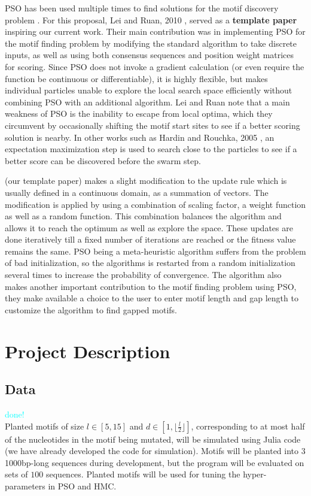 \documentclass{article}
\begin{document}
PSO has been used multiple times to find solutions for the motif discovery problem \cite{hardin2005dna,lei2010particle,reddy2010planted,ge2019discovery}. For this proposal, Lei and Ruan, 2010 \cite{lei2010particle}, served as a \textbf{template paper} inspiring our current work. Their main contribution was in implementing PSO for the motif finding problem by modifying the standard algorithm to take discrete inputs, as well as using both consensus sequences and position weight matrices for scoring. Since PSO does not invoke a gradient calculation (or even require the function be continuous or differentiable), it is highly flexible, but makes individual particles unable to explore the local search space efficiently without combining PSO with an additional algorithm. Lei and Ruan note that a main weakness of PSO is the inability to escape from local optima, which they circumvent by occasionally shifting the motif start sites to see if a better scoring solution is nearby. In other works such as Hardin and Rouchka, 2005 \cite{hardin2005dna}, an expectation maximization step is used to search close to the particles to see if a better score can be discovered before the swarm step.

\cite{lei2010particle}(our template paper) makes a slight modification to the update rule which is usually defined in a continuous domain, as a summation of vectors. The modification is applied by using a combination of scaling factor, a weight function as well as a random function. This combination balances the algorithm and allows it to reach the optimum as well as explore the space. These updates are done iteratively till a fixed number of iterations are reached or the fitness value remains the same. PSO being a meta-heuristic algorithm suffers from the problem of bad initialization, so the algorithms is restarted from a random initialization several times to increase the probability of convergence.
The algorithm also makes another important contribution to the motif finding problem using PSO, they make available a choice to the user to enter motif length and gap length to customize the algorithm to find gapped motifs. 
\section{Project Description}
\subsection{Data}
\textcolor{cyan}{done!} \\
Planted motifs of size $l \in [5, 15]$ and $d \in [1, \lfloor \frac{l}{2} \rfloor]$, corresponding to at most half of the nucleotides in the motif being mutated, will be simulated using Julia code (we have already developed the code for simulation). Motifs will be planted into $3$ 1000bp-long sequences during development, but the program will be evaluated on sets of $100$ sequences. Planted motifs will be used for tuning the hyper-parameters in PSO and HMC.  
  
\end{document}
